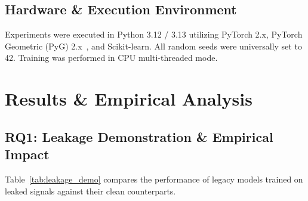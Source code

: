 \documentclass[conference]{IEEEtran}
\begin{document}
\subsection{Hardware \& Execution Environment}
Experiments were executed in Python 3.12 / 3.13 utilizing PyTorch 2.x, PyTorch Geometric (PyG) 2.x~\cite{fey2019fast}, and Scikit-learn. All random seeds were universally set to 42. Training was performed in CPU multi-threaded mode.

\section{Results \& Empirical Analysis}
\label{sec:results}

\subsection{RQ1: Leakage Demonstration \& Empirical Impact}
Table~\ref{tab:leakage_demo} compares the performance of legacy models trained on leaked signals against their clean counterparts.

\begin{table}[t]
\centering
\caption{Impact of Forensic Target Leakage Elimination}
\label{tab:leakage_demo}
\end{table}
\end{document}
